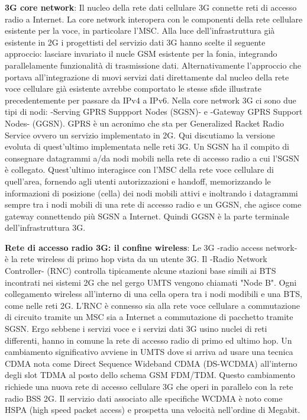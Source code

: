 \documentclass[a4paper,10pt]{article} %
\renewcommand{\b}[1]{%
    {\textbf{#1}}}
\begin{document}
\b{3G core network}: Il nucleo della rete dati cellulare 3G connette reti di accesso radio a Internet. La core network interopera con le componenti della rete cellulare esistente per la voce, in particolare l'MSC. Alla luce dell'infrastruttura già esistente in 2G i progettisti del servizio dati 3G hanno scelte il seguente approccio: lasciare invariato il nucle GSM esistente per la fonia, integrando parallelamente funzionalità di trasmissione dati. Alternativamente l'approccio che portava all'integrazione di nuovi servizi dati direttamente dal nucleo della rete voce cellulare già esistente avrebbe comportato le stesse sfide illustrate precedentemente per passare da IPv4 a IPv6. Nella core network 3G ci sono due tipi di nodi: -Serving GPRS Suppport Nodes (SGSN)- e -Gateway GPRS Support Nodes- (GGSN). GPRS è un acronimo che sta per Generalized Racket Radio Service ovvero un servizio implementato in 2G. Qui discutiamo la versione evoluta di quest'ultimo implementata nelle reti 3G. Un SGSN ha il compito di consegnare datagrammi a/da nodi mobili nella rete di accesso radio a cui l'SGSN è collegato. Quest'ultimo interagisce con l'MSC della rete voce cellulare di quell'area, fornendo agli utenti autorizzazioni e handoff, memorizzando le informazioni di posizione (cella) dei nodi mobili attivi e inoltrando i datagrammi sempre tra i nodi mobili di una rete di accesso radio e un GGSN, che agisce come gateway connettendo più SGSN a Internet. Quindi GGSN è la parte terminale dell'infrastruttura 3G.

\b{Rete di accesso radio 3G: il confine wireless}: Le 3G -radio access network- è la rete wireless di primo hop vista da un utente 3G. Il -Radio Network Controller- (RNC) controlla tipicamente alcune stazioni base simili ai BTS incontrati nei sistemi 2G che nel gergo UMTS vengono chiamati "Node B". Ogni collegamento wireless all'interno di una cella opera tra i nodi modibili e una BTS, come nelle reti 2G. L'RNC è connesso sia alla rete voce cellulare a commutazione di circuito tramite un MSC sia a Internet a commutazione di pacchetto tramite SGSN. Ergo sebbene i servizi voce e i servizi dati 3G usino nuclei di reti differenti, hanno in comune la rete di accesso radio di primo ed ultimo hop. Un cambiamento significativo avviene in UMTS dove si arriva ad usare una tecnica CDMA nota come Direct Sequence Wideband CDMA (DS-WCDMA) all'interno degli slot TDMA al posto dello schema GSM FDM/TDM. Questo cambiamento richiede una nuova rete di accesso cellulare 3G che operi in parallelo con la rete radio BSS 2G. Il servizio dati associato alle specifiche WCDMA è noto come HSPA (high speed packet access) e prospetta una velocità nell'ordine di Megabit.
\end{document}
